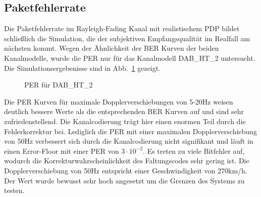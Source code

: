 \subsection{Paketfehlerrate}
Die Paketfehlerrate im Rayleigh-Fading Kanal mit realistischem PDP bildet schließlich die Simulation, die der subjektiven Empfangsqualität im Realfall am nächsten kommt. Wegen der Ähnlichkeit der BER Kurven der beiden Kanalmodelle, wurde die PER nur für das Kanalmodell DAB\_HT\_2 untersucht. Die Simulationsergebenisse sind in Abb.~\ref{plot:doppler_per} gezeigt.

\begin{figure}[htb]
\begin{center}
\end{center}
\caption{PER für DAB\_HT\_2}
\label{plot:doppler_per}
\end{figure}

Die PER Kurven für maximale Dopplerverschiebungen von 5-20Hz weisen deutlich bessere Werte als die entsprechenden BER Kurven auf und sind sehr zufriedenstellend. Die Kanalcodierung trägt hier einen enormen Teil durch die Fehlerkorrektur bei. Lediglich die PER mit einer maximalen Dopplerverschiebung von 50Hz verbessert sich durch die Kanalcodierung nicht signifikant und läuft in einen Error-Floor mit einer PER von $3 \cdot 10^{-2}$. Es treten zu viele Bitfehler auf, wodurch die Korrekturwahrscheinlichkeit des Faltungscodes sehr gering ist. Die Dopplerverschiebung von 50Hz entspricht einer Geschwindigkeit von 270km/h. Der Wert wurde bewusst sehr hoch angesetzt um die Grenzen des Systems zu testen.